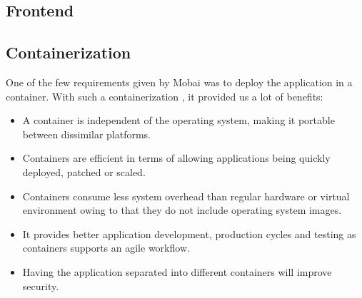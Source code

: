 \subsection*{Frontend}

\subsection*{Containerization}
One of the few requirements given by Mobai was to deploy the application in a container. With such a containerization \cite{Containerization}, it provided us a lot of benefits:
\begin{itemize}
    \item A container is independent of the operating system, making it portable between dissimilar platforms. 
    \item Containers are efficient in terms of allowing applications being quickly deployed, patched or scaled. 
    \item Containers consume less system overhead than regular hardware or virtual environment owing to that they do not include operating system images. 
    \item It provides better application development, production cycles and testing as containers supports an agile workflow.
    \item Having the application separated into different containers will improve security. 
\end{itemize}



